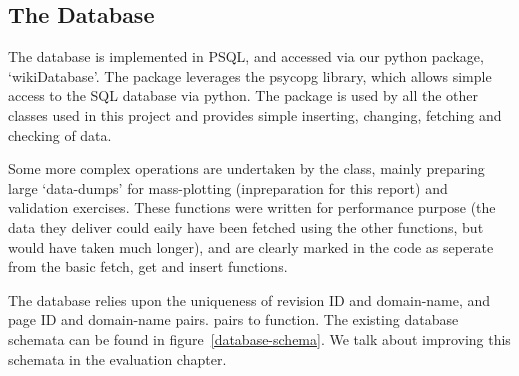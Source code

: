 \subsection*{The Database}
The database is implemented in PSQL, and accessed via our python
package, `wikiDatabase'. The package leverages the psycopg library,
which allows simple access to the SQL database via
python.\cite{psycopg2} The package is used by all the other classes
used in this project and provides simple inserting, changing, fetching
and checking of data.

Some more complex operations are undertaken by the class, mainly
preparing large `data-dumps' for mass-plotting (inpreparation for this
report) and validation exercises. These functions were written for
performance purpose (the data they deliver could eaily have been
fetched using the other functions, but would have taken much longer),
and are clearly marked in the code as seperate from the basic fetch,
get and insert functions. 

The database relies upon the uniqueness of revision ID and
domain-name, and page ID and domain-name pairs.  pairs to
function. The existing database schemata can be found in
figure~\ref{database-schema}. We talk about improving this schemata in
the evaluation chapter.

